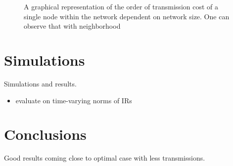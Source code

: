 \documentclass{article}
\begin{document}
\begin{figure}
    \centering
    
    \vspace*{-0.8cm}
    \caption[]{A graphical representation of the order of transmission cost of a single node within the network dependent on network size. One can observe that with neighborhood }
    \label{fig:transcost:bigo}
\end{figure}

\section{Simulations}
\label{sec:simulations}
Simulations and results.
\begin{itemize}
    \item evaluate on time-varying norms of IRs
\end{itemize}

\begin{figure}
    \centering
    
    \caption[]{}
\end{figure}

\section[]{Conclusions}
\label{sec:conclusions}
Good results coming close to optimal case with less transmissions.


\end{document}

